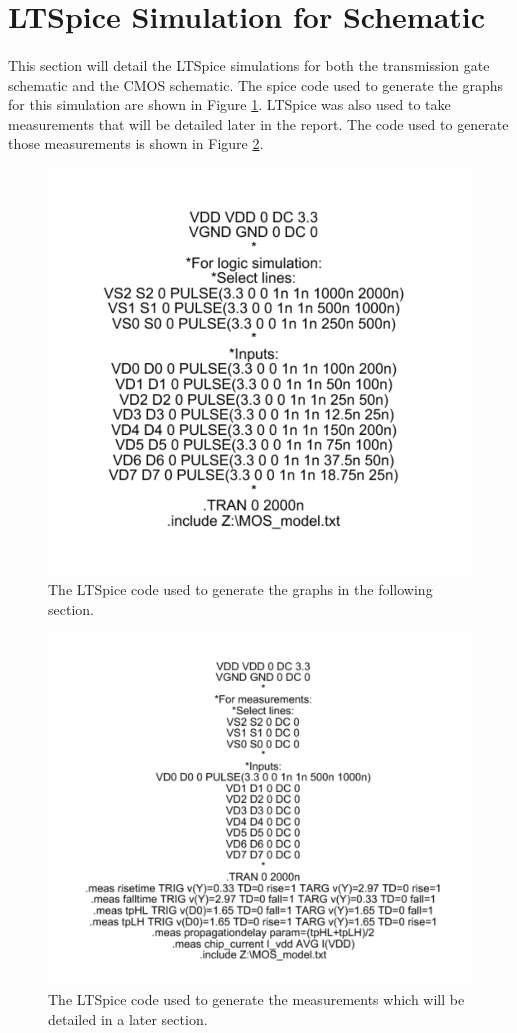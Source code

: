 \documentclass{article}
\begin{document}
\section{LTSpice Simulation for Schematic}
  \paragraph{}
  This section will detail the LTSpice simulations for both the transmission gate schematic and the CMOS schematic. The spice code used to generate the graphs for this simulation are shown in Figure \ref{fig:simcode}. LTSpice was also used to take measurements that will be detailed later in the report. The code used to generate those measurements is shown in Figure \ref{fig:meascode}.

  \begin{figure}[H]
    \centering
    \includegraphics[width=0.5\linewidth, frame]{screenshots/spice-sim-code.png}
    \caption{The LTSpice code used to generate the graphs in the following section.}
    \label{fig:simcode}
  \end{figure}

  \begin{figure}[H]
    \centering
    \includegraphics[width=0.5\linewidth, frame]{screenshots/spice-meas-code.png}
    \caption{The LTSpice code used to generate the measurements which will be detailed in a later section.}
    \label{fig:meascode}
  \end{figure}
\end{document}
